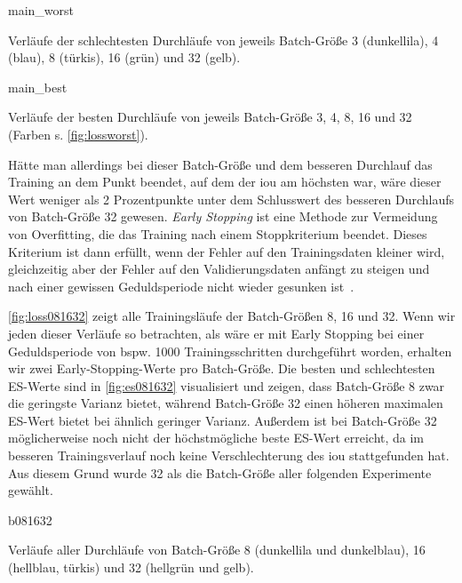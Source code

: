 \begin{losses}{main_worst}
	\caption{Verläufe der schlechtesten Durchläufe von jeweils Batch-Größe 3 (dunkellila), 4 (blau), 8 (türkis), 16 (grün) und 32 (gelb).}
	\label{fig:lossworst}
\end{losses}

\begin{losses}{main_best}
	\caption{Verläufe der besten Durchläufe von jeweils Batch-Größe 3, 4, 8, 16 und 32 (Farben s. \autoref{fig:lossworst}).}
	\label{fig:lossbest}
\end{losses}

Hätte man allerdings bei dieser Batch-Größe und dem besseren Durchlauf das Training an dem Punkt beendet, auf dem der \gls{iou} am höchsten war, wäre dieser Wert weniger als 2 Prozentpunkte unter dem Schlusswert des besseren Durchlaufs von Batch-Größe 32 gewesen.
\emph{Early Stopping} ist eine Methode zur Vermeidung von Overfitting, die das Training nach einem Stoppkriterium beendet.
Dieses Kriterium ist dann erfüllt, wenn der Fehler auf den Trainingsdaten kleiner wird, gleichzeitig aber der Fehler auf den Validierungsdaten anfängt zu steigen und nach einer gewissen Geduldsperiode nicht wieder gesunken ist~\cite{Goodfellow.2016}.

\autoref{fig:loss081632} zeigt alle Trainingsläufe der Batch-Größen 8, 16 und 32.
Wenn wir jeden dieser Verläufe so betrachten, als wäre er mit Early Stopping bei einer Geduldsperiode von bspw. 1000 Trainingsschritten durchgeführt worden, erhalten wir zwei Early-Stopping-Werte pro Batch-Größe.
Die besten und schlechtesten ES-Werte sind in \autoref{fig:es081632} visualisiert und zeigen, dass Batch-Größe 8 zwar die geringste Varianz bietet, während Batch-Größe 32 einen höheren maximalen ES-Wert bietet bei ähnlich geringer Varianz.
Außerdem ist bei Batch-Größe 32 möglicherweise noch nicht der höchstmögliche beste ES-Wert erreicht, da im besseren Trainingsverlauf noch keine Verschlechterung des \gls{iou} stattgefunden hat.
Aus diesem Grund wurde 32 als die Batch-Größe aller folgenden Experimente gewählt.

\begin{losses}{b081632}
	\caption{Verläufe aller Durchläufe von Batch-Größe 8 (dunkellila und dunkelblau), 16 (hellblau, türkis) und 32 (hellgrün und gelb).}
	\label{fig:loss081632}
\end{losses}




